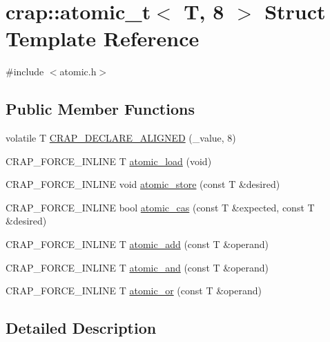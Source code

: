 \hypertarget{structcrap_1_1atomic__t_3_01_t_00_018_01_4}{\section{crap\+:\+:atomic\+\_\+t$<$ T, 8 $>$ Struct Template Reference}
\label{structcrap_1_1atomic__t_3_01_t_00_018_01_4}
}


{\ttfamily \#include $<$atomic.\+h$>$}

\subsection*{Public Member Functions}
\begin{DoxyCompactItemize}
\item 
volatile T \hyperlink{structcrap_1_1atomic__t_3_01_t_00_018_01_4_a4a2bfa3783c62df8aeedc8ecb1cc069e}{C\+R\+A\+P\+\_\+\+D\+E\+C\+L\+A\+R\+E\+\_\+\+A\+L\+I\+G\+N\+E\+D} (\+\_\+value, 8)
\item 
C\+R\+A\+P\+\_\+\+F\+O\+R\+C\+E\+\_\+\+I\+N\+L\+I\+N\+E T \hyperlink{structcrap_1_1atomic__t_3_01_t_00_018_01_4_a12e13204c1f0052a0c36234f1078b02a}{atomic\+\_\+load} (void)
\item 
C\+R\+A\+P\+\_\+\+F\+O\+R\+C\+E\+\_\+\+I\+N\+L\+I\+N\+E void \hyperlink{structcrap_1_1atomic__t_3_01_t_00_018_01_4_aa727ac58b07876de1788eb0f8d6b7def}{atomic\+\_\+store} (const T \&desired)
\item 
C\+R\+A\+P\+\_\+\+F\+O\+R\+C\+E\+\_\+\+I\+N\+L\+I\+N\+E bool \hyperlink{structcrap_1_1atomic__t_3_01_t_00_018_01_4_a9c27f4cbe766b6bd31e4477422fd8a3f}{atomic\+\_\+cas} (const T \&expected, const T \&desired)
\item 
C\+R\+A\+P\+\_\+\+F\+O\+R\+C\+E\+\_\+\+I\+N\+L\+I\+N\+E T \hyperlink{structcrap_1_1atomic__t_3_01_t_00_018_01_4_a52331690e1992a24c8cc1151d8251881}{atomic\+\_\+add} (const T \&operand)
\item 
C\+R\+A\+P\+\_\+\+F\+O\+R\+C\+E\+\_\+\+I\+N\+L\+I\+N\+E T \hyperlink{structcrap_1_1atomic__t_3_01_t_00_018_01_4_a457908e653f35faa59b9522a7f6590ae}{atomic\+\_\+and} (const T \&operand)
\item 
C\+R\+A\+P\+\_\+\+F\+O\+R\+C\+E\+\_\+\+I\+N\+L\+I\+N\+E T \hyperlink{structcrap_1_1atomic__t_3_01_t_00_018_01_4_a5cef782fa3abfa83917825c36e2959d6}{atomic\+\_\+or} (const T \&operand)
\end{DoxyCompactItemize}


\subsection{Detailed Description}
